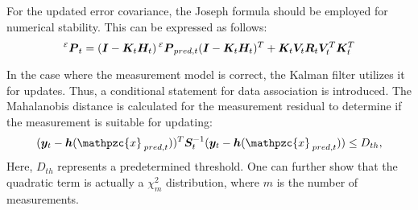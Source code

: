 \documentclass[12pt, a4paper]{article}
\begin{document}
For the updated error covariance, the Joseph formula should be employed for numerical stability. This can be expressed as follows:
\[
  \prescript{\scriptscriptstyle\mathcal{E}}{}{\bm{P}}_{t}=
  (\bm{I}-\bm{K}_{t}\bm{H}_{t})
  \prescript{\scriptscriptstyle\mathcal{E}}{}{\bm{P}}_{pred,t}
  (\bm{I}-\bm{K}_{t}\bm{H}_{t})^{T}+
  \bm{K}_{t}\bm{V}_{t}\bm{R}_{t}\bm{V}_{t}^{T}\bm{K}_{t}^{T}
\]

In the case where the measurement model is correct, the Kalman filter utilizes it for updates. Thus, a conditional statement for data association is introduced. The Mahalanobis distance is calculated for the measurement residual to determine if the measurement is suitable for updating:
\[
  (\bm{y}_{t}-\bm{h}(\mathpzc{x}_{\mkern4mu pred,t}))^{T}
  \bm{S}_{t}^{-1}(\bm{y}_{t}-\bm{h}(\mathpzc{x}_{\mkern4mu pred,t}))
  \leq D_{th},
\]
Here, $D_{th}$ represents a predetermined threshold. One can further show that the quadratic term is actually a $\chi_{m}^{2}$ distribution, where $m$ is the number of measurements.
\end{document}
